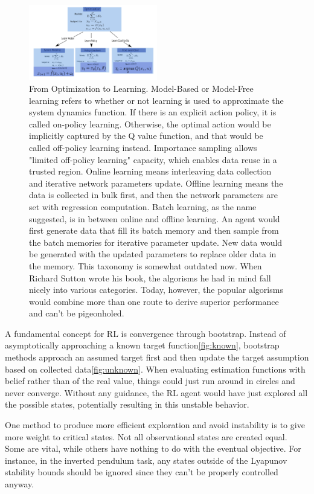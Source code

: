 \documentclass[journal]{IEEEtran}
\begin{document}
\begin{figure}[H]
    \centering
    \includegraphics[width=0.5\textwidth]{Control.png}
    \caption{From Optimization to Learning. Model-Based or Model-Free learning refers to whether or not learning is used to approximate the system dynamics function. If there is an explicit action policy, it is called on-policy learning. Otherwise, the optimal action would be implicitly captured by the Q value function, and that would be called off-policy learning instead. Importance sampling allows "limited off-policy learning" capacity, which enables data reuse in a trusted region. Online learning means interleaving data collection and iterative network parameters update. Offline learning means the data is collected in bulk first, and then the network parameters are set with regression computation. Batch learning, as the name suggested, is in between online and offline learning. An agent would first generate data that fill its batch memory and then sample from the batch memories for iterative parameter update. New data would be generated with the updated parameters to replace older data in the memory. This taxonomy is somewhat outdated now. When Richard Sutton wrote his book, the algorisms he had in mind fall nicely into various categories. Today, however, the popular algorisms would combine more than one route to derive superior performance and can't be pigeonholed.}
    \label{fig:rl}
\end{figure} 

A fundamental concept for RL is convergence through bootstrap. Instead of asymptotically approaching a known target function\ref{fig:known}, bootstrap methods approach an assumed target first and then update the target assumption based on collected data\ref{fig:unknown}. When evaluating estimation functions with belief rather than of the real value, things could just run around in circles and never converge. Without any guidance, the RL agent would have just explored all the possible states, potentially resulting in this unstable behavior. 

One method to produce more efficient exploration and avoid instability is to give more weight to critical states. Not all observational states are created equal. Some are vital, while others have nothing to do with the eventual objective. For instance, in the inverted pendulum task, any states outside of the Lyapunov stability bounds should be ignored since they can't be properly controlled anyway. 
\end{document}
